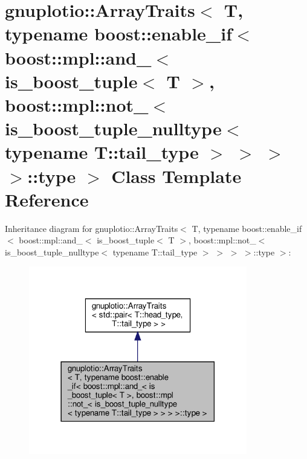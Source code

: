 \hypertarget{classgnuplotio_1_1ArrayTraits_3_01T_00_01typename_01boost_1_1enable__if_3_01boost_1_1mpl_1_1and_371638f7d82cde4b7a8a064d0797371a}{}\section{gnuplotio\+:\+:Array\+Traits$<$ T, typename boost\+:\+:enable\+\_\+if$<$ boost\+:\+:mpl\+:\+:and\+\_\+$<$ is\+\_\+boost\+\_\+tuple$<$ T $>$, boost\+:\+:mpl\+:\+:not\+\_\+$<$ is\+\_\+boost\+\_\+tuple\+\_\+nulltype$<$ typename T\+:\+:tail\+\_\+type $>$ $>$ $>$ $>$\+:\+:type $>$ Class Template Reference}
\label{classgnuplotio_1_1ArrayTraits_3_01T_00_01typename_01boost_1_1enable__if_3_01boost_1_1mpl_1_1and_371638f7d82cde4b7a8a064d0797371a}


Inheritance diagram for gnuplotio\+:\+:Array\+Traits$<$ T, typename boost\+:\+:enable\+\_\+if$<$ boost\+:\+:mpl\+:\+:and\+\_\+$<$ is\+\_\+boost\+\_\+tuple$<$ T $>$, boost\+:\+:mpl\+:\+:not\+\_\+$<$ is\+\_\+boost\+\_\+tuple\+\_\+nulltype$<$ typename T\+:\+:tail\+\_\+type $>$ $>$ $>$ $>$\+:\+:type $>$\+:\nopagebreak
\begin{figure}[H]
\begin{center}
\leavevmode
\includegraphics[width=270pt]{classgnuplotio_1_1ArrayTraits_3_01T_00_01typename_01boost_1_1enable__if_3_01boost_1_1mpl_1_1and_691fea0d25810f91cf71bd7a5d3b39c5}
\end{center}
\end{figure}


